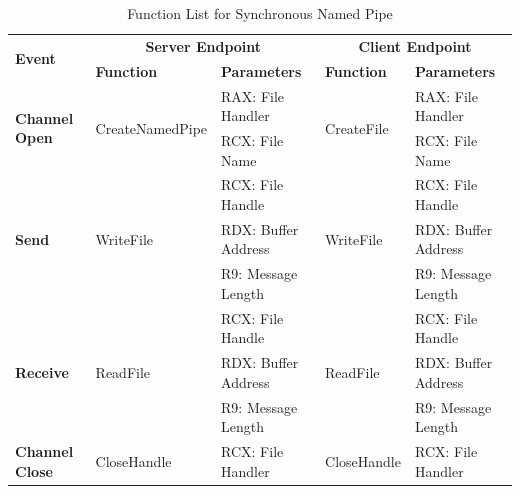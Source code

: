     \begin{table}[H]
        \centering
        \caption{Function List for Synchronous Named Pipe}
        \label{synfunctions}
        \begin{tabular}{|l|l|l|l|l|}
            \hline
             \multirow{2}{*}{\textbf{Event}} &
               \multicolumn{2}{c|}{\textbf{Server Endpoint}} &
               \multicolumn{2}{c|}{\textbf{Client Endpoint}} \\
             \cline{2-5}
              & \textbf{Function}& \textbf{Parameters} & \textbf{Function} & \textbf{Parameters}  \\
             \hline
             \multirow{2}{*}{{\textbf{Channel Open}}}
             &\multirow{2}{*}{{CreateNamedPipe}} &  RAX: File Handler & \multirow{2}{*}{CreateFile} &  RAX: File Handler\\
              \cline{3-3} \cline{5-5}
             &&  RCX: File Name &  &  RCX: File Name\\
            \hline
             \multirow{3}{*}{{\textbf{Send}}}
             &\multirow{3}{*}{WriteFile} &  RCX: File Handle & \multirow{3}{*}{WriteFile} &  RCX: File Handle\\
              \cline{3-3} \cline{5-5}
             &&  RDX: Buffer Address &  &  RDX: Buffer Address\\
                           \cline{3-3} \cline{5-5}
             & &  R9: Message Length &  &  R9: Message Length\\
            \hline
             \multirow{3}{*}{{\textbf{Receive}}}
             & \multirow{3}{*}{ReadFile}&  RCX: File Handle & \multirow{3}{*}{ReadFile} &  RCX: File Handle\\
              \cline{3-3} \cline{5-5}
              &&  RDX: Buffer Address &  &  RDX: Buffer Address\\
                           \cline{3-3} \cline{5-5}
             & &  R9: Message Length &  &  R9: Message Length\\
            \hline
           {{\textbf{Channel Close}}}
             &{CloseHandle} & {RCX: File Handler} & {CloseHandle} & {RCX: File Handler}\\
            \hline
        \end{tabular}
    \end{table}

